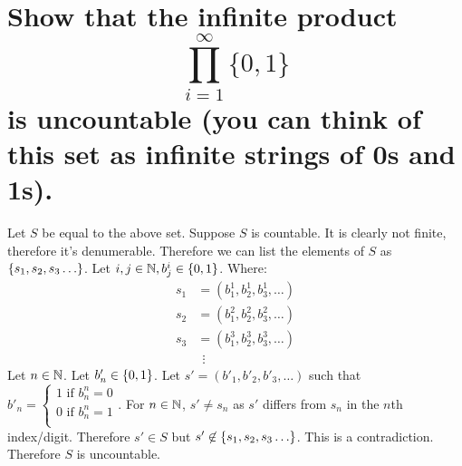 \section{Show that the infinite product 
    \[\prod_{i=1}^{\infty}\{0,1\}
        \]
    is uncountable (you can think of this set as infinite strings of 0s and 1s).}
    Let $S$ be equal to the above set.
    Suppose $S$ is countable. It is clearly not finite, therefore it's denumerable.
    Therefore we can list the elements of $S$ as $\{ s_1 , s_2, s_3 \hdots \}$.
    Let $i, j \in \mathbb{N}, b_j^i \in \{ 0,1 \}$.
    Where:
    \begin{align*}
        s_1 &= (b_1^1, b_2^1, b_3^1, \hdots) \\ 
        s_2 &= (b_1^2, b_2^2, b_3^2, \hdots) \\ 
        s_3 &= (b_1^3, b_2^3, b_3^3, \hdots) \\ 
        &\ \ \vdots
    \end{align*}
    Let $n \in \mathbb{N}$.
    Let $b'_n \in \{ 0,1 \}$.
    Let $s' = (b'_1, b'_2, b'_3, \hdots)$ such that 
    $b'_n = 
    \begin{cases}
        1 \text{ if } b_n^n = 0 \\ 
        0 \text{ if } b_n^n = 1 \\ 
    \end{cases}
    $.
    For $n \in \mathbb{N}$, $s' \neq s_n$ as $s'$ differs from $s_n$ in the $n$th index/digit.
    Therefore $s' \in S$ but $s' \not\in \{ s_1 , s_2, s_3 \hdots \}$.
    This is a contradiction.
    Therefore $S$ is uncountable.